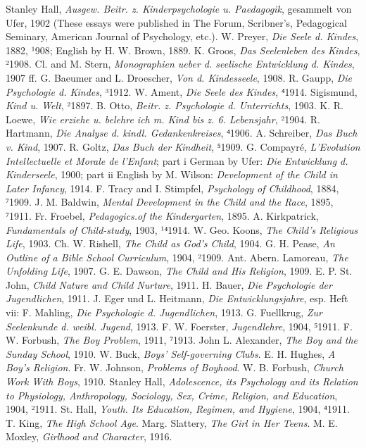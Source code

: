 Stanley Hall, \emph{Ausgew. Beitr. z. Kinderpsychologie u. Paedagogik}, gesammelt von Ufer, 1902 (These essays were published in The Forum, Scribner’s, Pedagogical Seminary, American Journal of Psychology, etc.). W. Preyer, \emph{Die Seele d. Kindes}, 1882, ¹908; English by H. W. Brown, 1889. K. Groos, \emph{Das Seelenleben des Kindes}, ²1908. Cl. and M. Stern, \emph{Monographien ueber d. seelische Entwicklung d. Kindes}, 1907 ff. G. Baeumer and L. Droescher, \emph{Von d. Kindesseele}, 1908. R. Gaupp, \emph{Die Psychologie d. Kindes}, ³1912. W. Ament, \emph{Die Seele des Kindes}, ⁴1914. Sigismund, \emph{Kind u. Welt}, ²1897. B. Otto, \emph{Beitr. z. Psychologie d. Unterrichts}, 1903. K. R. Loewe, \emph{Wie erziehe u. belehre ich m. Kind bis z. 6. Lebensjahr}, ²1904. R. Hartmann, \emph{Die Analyse d. kindl. Gedankenkreises}, ⁴1906. A. Schreiber, \emph{Das Buch v. Kind}, 1907. R. Goltz, \emph{Das Buch der Kindheit}, ⁵1909. G. Compayré, \emph{L’Evolution Intellectuelle et Morale de l’Enfant}; part i German by Ufer: \emph{Die Entwicklung d. Kinderseele}, 1900; part ii English by M. Wilson: \emph{Development of the Child in Later Infancy}, 1914. F. Tracy and I. Stimpfel, \emph{Psychology of Childhood}, 1884, ⁷1909. J. M. Baldwin, \emph{Mental Development in the Child and the Race}, 1895, ⁷1911. Fr. Froebel, \emph{Pedagogics.of the Kindergarten}, 1895. A. Kirkpatrick, \emph{Fundamentals of Child-study}, 1903, ¹⁴1914. W. Geo. Koons, \emph{The Child’s Religious Life}, 1903. Ch. W. Rishell, \emph{The Child as God’s Child}, 1904. G. H. Pease, \emph{An Outline of a Bible School Curriculum}, 1904, ²1909. Ant. Abern. Lamoreau, \emph{The Unfolding Life}, 1907. G. E. Dawson, \emph{The Child and His Religion}, 1909. E. P. St. John, \emph{Child Nature and Child Nurture}, 1911. H. Bauer, \emph{Die Psychologie der Jugendlichen}, 1911. J. Eger und L. Heitmann, \emph{Die Entwicklungsjahre}, esp. Heft vii: F. Mahling, \emph{Die Psychologie d. Jugendlichen}, 1913. G. Fuellkrug, \emph{Zur Seelenkunde d. weibl. Jugend}, 1913. F. W. Foerster, \emph{Jugendlehre}, 1904, ⁵1911. F. W. Forbush, \emph{The Boy Problem}, 1911, ⁷1913. John L. Alexander, \emph{The Boy and the Sunday School}, 1910. W. Buck, \emph{Boys’ Self-governing Clubs}. E. H. Hughes, \emph{A Boy’s Religion}. Fr. W. Johnson, \emph{Problems of Boyhood}. W. B. Forbush, \emph{Church Work With Boys}, 1910. Stanley Hall, \emph{Adolescence, its Psychology and its Relation to Physiology, Anthropology, Sociology, Sex, Crime, Religion, and Education}, 1904, ²1911. St. Hall, \emph{Youth. Its Education, Regimen, and Hygiene}, 1904, ⁴1911. T. King, \emph{The High School Age}. Marg. Slattery, \emph{The Girl in Her Teens}. M. E. Moxley, \emph{Girlhood and Character}, 1916.

